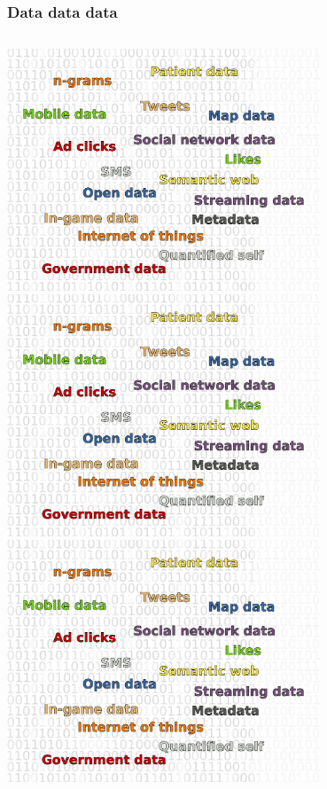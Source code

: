 \documentclass[11pt,xcolor=table]{beamer}
\begin{document}

\begin{frame}
\frametitle{Data data data}

\begin{center}

\begin{columns}

\begin{column}{0.5\textwidth}
\begin{center}
\includegraphics[width=0.7\textwidth]{graphics/data_cloud2.pdf}\\
\includegraphics[width=0.7\textwidth]{graphics/data_cloud2.pdf}\\
\bigskip
\includegraphics[width=0.7\textwidth]{graphics/data_cloud2.pdf}
\end{center}
\end{column}


\end{columns}
\end{center}
\end{frame}
\end{document}
